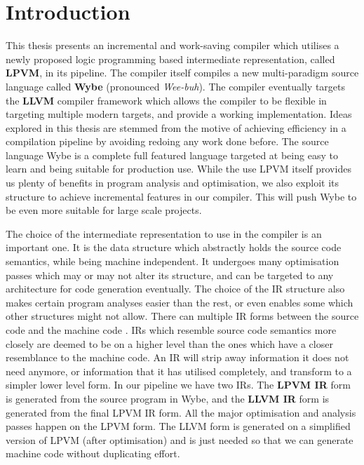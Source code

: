\chapter{Introduction}

This thesis presents an incremental and work-saving compiler which utilises a
newly proposed logic programming based intermediate representation, called
\textbf{LPVM}, in its pipeline. The compiler itself compiles a new
multi-paradigm source language called \textbf{Wybe} (pronounced
\textit{Wee-buh}). The compiler eventually targets the \textbf{LLVM} compiler
framework which allows the compiler to be flexible in targeting multiple modern
targets, and provide a working implementation. Ideas explored in this thesis
are stemmed from the motive of achieving efficiency in a compilation pipeline
by avoiding redoing any work done before. The source language Wybe is a
complete full featured language targeted at being easy to learn and being
suitable for production use. While the use LPVM itself provides us plenty of
benefits in program analysis and optimisation, we also exploit its structure to
achieve incremental features in our compiler. This will push Wybe to be even
more suitable for large scale projects.

The choice of the intermediate representation to use in the compiler is an
important one. It is the data structure which abstractly holds the source code
semantics, while being machine independent. It undergoes many optimisation
passes which may or may not alter its structure, and can be targeted to any
architecture for code generation eventually. The choice of the IR structure
also makes certain program analyses easier than the rest, or even enables some
which other structures might not allow. There can multiple IR forms between the
source code and the machine code \citep{irnote}. IRs which resemble source code
semantics more closely are deemed to be on a higher level than the ones which
have a closer resemblance to the machine code. An IR will strip away
information it does not need anymore, or information that it has utilised
completely, and transform to a simpler lower level form. In our pipeline we
have two IRs. The \textbf{LPVM IR} form is generated from the source program in
Wybe, and the \textbf{LLVM IR} form is generated from the final LPVM IR
form. All the major optimisation and analysis passes happen on the LPVM
form. The LLVM form is generated on a simplified version of LPVM (after
optimisation) and is just needed so that we can generate machine code without
duplicating effort.

